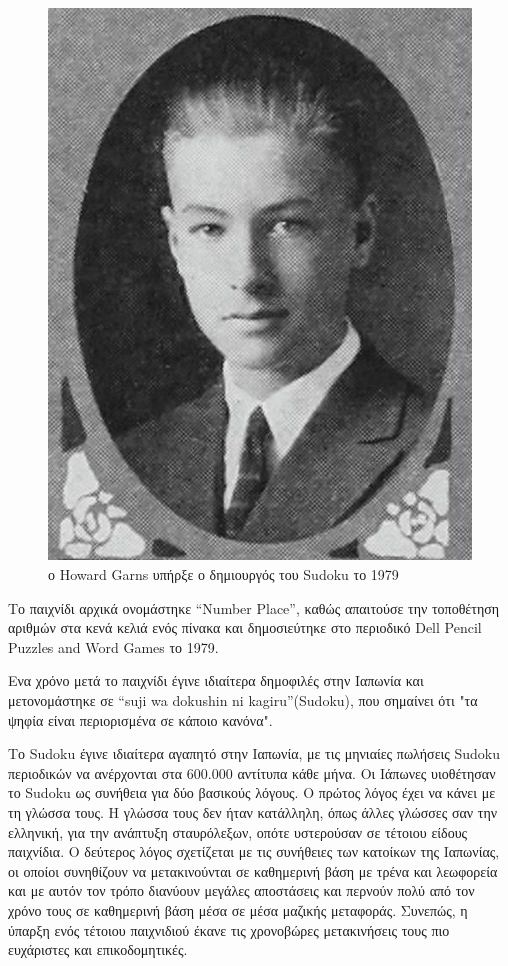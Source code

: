 \documentclass[oneside,12pt]{book}
\theoremstyle{definition}
\begin{document}
\begin{figure}[h]
	\centering
	\includegraphics[scale=0.3]{Figures/Howard Garns.jpeg}
	\caption{ο Howard Garns υπήρξε ο δημιουργός του Sudoku το 1979}
\end{figure}

Το παιχνίδι αρχικά ονομάστηκε “Number Place”, καθώς απαιτούσε την τοποθέτηση αριθμών στα κενά κελιά ενός πίνακα και δημοσιεύτηκε στο περιοδικό Dell Pencil Puzzles and Word Games το 1979. \par

Ενα χρόνο μετά το παιχνίδι έγινε ιδιαίτερα δημοφιλές στην Ιαπωνία και μετονομάστηκε σε “suji wa dokushin ni
kagiru”(Sudoku), που σημαίνει ότι "τα ψηφία είναι περιορισμένα σε κάποιο κανόνα". \par

Το Sudoku έγινε ιδιαίτερα αγαπητό στην Ιαπωνία, με τις μηνιαίες πωλήσεις Sudoku περιοδικών να ανέρχονται στα
600.000 αντίτυπα κάθε μήνα.
Οι Ιάπωνες υιοθέτησαν το Sudoku ως συνήθεια για δύο
βασικούς λόγους. Ο πρώτος λόγος έχει να κάνει με τη γλώσσα τους. Η γλώσσα τους δεν ήταν κατάλληλη, όπως άλλες γλώσσες σαν την ελληνική, για την ανάπτυξη σταυρόλεξων, οπότε υστερούσαν σε τέτοιου είδους παιχνίδια. Ο δεύτερος λόγος σχετίζεται με τις συνήθειες των κατοίκων της Ιαπωνίας, οι οποίοι συνηθίζουν να μετακινούνται σε καθημερινή βάση με τρένα και λεωφορεία και με αυτόν τον τρόπο διανύουν μεγάλες αποστάσεις και περνούν πολύ από τον χρόνο τους σε καθημερινή βάση μέσα σε μέσα μαζικής μεταφοράς. Συνεπώς, η ύπαρξη ενός τέτοιου παιχνιδιού έκανε τις χρονοβώρες μετακινήσεις τους πιο ευχάριστες και επικοδομητικές. \par
\end{document}

